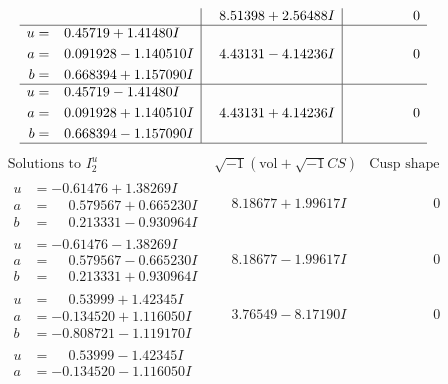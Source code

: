 \documentclass[1p]{elsarticle_modified}
\theoremstyle{definition}
\newcommand{\I}{\sqrt{-1}}
\begin{document}
$$\begin{array}{c|c|c}
 & \phantom{-}8.51398 + 2.56488 I & \phantom{-0.000000 } 0 \\ \hline\begin{aligned}
u &= \phantom{-}0.45719 + 1.41480 I \\
a &= \phantom{-}0.091928 - 1.140510 I \\
b &= \phantom{-}0.668394 + 1.157090 I\end{aligned}
 & \phantom{-}4.43131 - 4.14236 I & \phantom{-0.000000 } 0 \\ \hline\begin{aligned}
u &= \phantom{-}0.45719 - 1.41480 I \\
a &= \phantom{-}0.091928 + 1.140510 I \\
b &= \phantom{-}0.668394 - 1.157090 I\end{aligned}
 & \phantom{-}4.43131 + 4.14236 I & \phantom{-0.000000 } 0\\
 \hline 
 \end{array}$$\newpage$$\begin{array}{c|c|c}  
\text{Solutions to }I^u_{2}& \I (\text{vol} + \sqrt{-1}CS) & \text{Cusp shape}\\
 \hline 
\begin{aligned}
u &= -0.61476 + 1.38269 I \\
a &= \phantom{-}0.579567 + 0.665230 I \\
b &= \phantom{-}0.213331 - 0.930964 I\end{aligned}
 & \phantom{-}8.18677 + 1.99617 I & \phantom{-0.000000 } 0 \\ \hline\begin{aligned}
u &= -0.61476 - 1.38269 I \\
a &= \phantom{-}0.579567 - 0.665230 I \\
b &= \phantom{-}0.213331 + 0.930964 I\end{aligned}
 & \phantom{-}8.18677 - 1.99617 I & \phantom{-0.000000 } 0 \\ \hline\begin{aligned}
u &= \phantom{-}0.53999 + 1.42345 I \\
a &= -0.134520 + 1.116050 I \\
b &= -0.808721 - 1.119170 I\end{aligned}
 & \phantom{-}3.76549 - 8.17190 I & \phantom{-0.000000 } 0 \\ \hline\begin{aligned}
u &= \phantom{-}0.53999 - 1.42345 I \\
a &= -0.134520 - 1.116050 I \\

\end{aligned}
\end{array}$$
\end{document}
